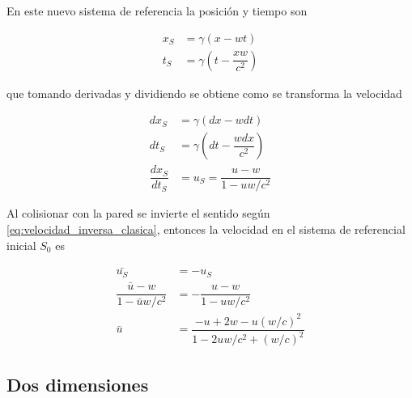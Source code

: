 \vspace{3mm}

En este nuevo sistema de referencia la posición y tiempo son

\begin{align}\label{eq:tiempo_sistema_muro_reposo}
    x_S &= \gamma(x - wt) \\
    t_S &= \gamma(t - \dfrac{xw}{c^2})
\end{align}

que tomando derivadas y dividiendo se obtiene como se transforma la velocidad

\begin{align}
    dx_S &= \gamma\left( dx - w dt \right) \nonumber\\
    dt_S &= \gamma \left( dt - \dfrac{w dx}{c^2} \right) \nonumber \\
    \dfrac{dx_S}{dt_S} &= u_S = \dfrac{u - w}{1 - u w/c^2} \label{eq:transformacion_velocidad_1D} 
\end{align}

\vspace{3mm}

Al colisionar con la pared se invierte el sentido según \ref{eq:velocidad_inversa_clasica}, entonces la velocidad en el sistema de referencial inicial \( S_0 \) es

\begin{align}
    \bar{u_S} &= -u_S \nonumber \\
    \dfrac{\bar{u} - w}{1 - \bar{u} w/c^2} &= -\dfrac{u - w}{1 - u w/c^2} \nonumber \\
    \bar{u} &= \dfrac{-u + 2w - u{(w/c)}^2}{1 - 2uw/c^2 + {(w/c)}^2} \label{eq:nueva_velocidad_1D}
\end{align}

\vspace{3mm}

\subsection{Dos dimensiones}

